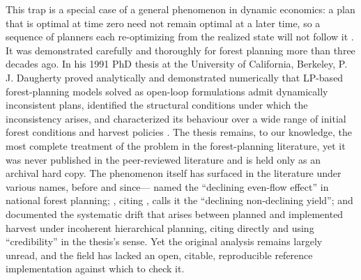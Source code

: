 \documentclass[12pt]{article}
\begin{document}
This trap is a special case of a general phenomenon in dynamic economics: a plan that is optimal at time zero need not remain optimal at a later time, so a sequence of planners each re-optimizing from the realized state will not follow it \citep{strotz1956myopia,kydland1977rules}. It was demonstrated carefully and thoroughly for forest planning more than three decades ago. In his 1991 PhD thesis at the University of California, Berkeley, P. J. Daugherty proved analytically and demonstrated numerically that LP-based forest-planning models solved as open-loop formulations admit dynamically inconsistent plans, identified the structural conditions under which the inconsistency arises, and characterized its behaviour over a wide range of initial forest conditions and harvest policies \citep{daugherty1991credibility}. The thesis remains, to our knowledge, the most complete treatment of the problem in the forest-planning literature, yet it was never published in the peer-reviewed literature and is held only as an archival hard copy. The phenomenon itself has surfaced in the literature under various names, before and since---\citet{mcquillan1986declining} named the ``declining even-flow effect'' in national forest planning; \citet[pp.~331--332]{gunn2007models}, citing \citet{daugherty1991credibility}, calls it the ``declining non-declining yield''; and \citet{paradis2013risk} documented the systematic drift that arises between planned and implemented harvest under incoherent hierarchical planning, citing \citet{daugherty1991credibility} directly and using ``credibility'' in the thesis's sense. Yet the original analysis remains largely unread, and the field has lacked an open, citable, reproducible reference implementation against which to check it.
\end{document}
